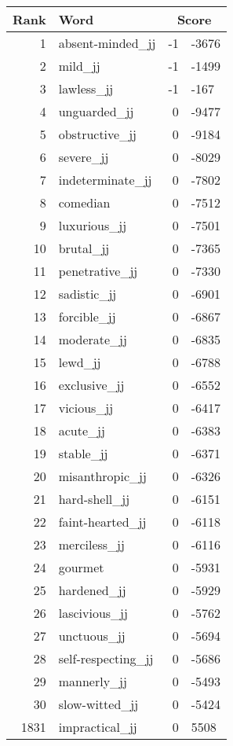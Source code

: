 \begin{longtable}[!htbp]{| rlr@{.}l |}
    \hline
    \textbf{Rank} & \textbf{Word} & \multicolumn{2}{c|}{\textbf{Score}} \\
    \hline
    \endhead
    1 & absent-minded\_jj & -1 & -3676 \\
    2 & mild\_jj & -1 & -1499 \\
    3 & lawless\_jj & -1 & -167 \\
    4 & unguarded\_jj & 0 & -9477 \\
    5 & obstructive\_jj & 0 & -9184 \\
    6 & severe\_jj & 0 & -8029 \\
    7 & indeterminate\_jj & 0 & -7802 \\
    8 & comedian & 0 & -7512 \\
    9 & luxurious\_jj & 0 & -7501 \\
    10 & brutal\_jj & 0 & -7365 \\
    11 & penetrative\_jj & 0 & -7330 \\
    12 & sadistic\_jj & 0 & -6901 \\
    13 & forcible\_jj & 0 & -6867 \\
    14 & moderate\_jj & 0 & -6835 \\
    15 & lewd\_jj & 0 & -6788 \\
    16 & exclusive\_jj & 0 & -6552 \\
    17 & vicious\_jj & 0 & -6417 \\
    18 & acute\_jj & 0 & -6383 \\
    19 & stable\_jj & 0 & -6371 \\
    20 & misanthropic\_jj & 0 & -6326 \\
    21 & hard-shell\_jj & 0 & -6151 \\
    22 & faint-hearted\_jj & 0 & -6118 \\
    23 & merciless\_jj & 0 & -6116 \\
    24 & gourmet & 0 & -5931 \\
    25 & hardened\_jj & 0 & -5929 \\
    26 & lascivious\_jj & 0 & -5762 \\
    27 & unctuous\_jj & 0 & -5694 \\
    28 & self-respecting\_jj & 0 & -5686 \\
    29 & mannerly\_jj & 0 & -5493 \\
    30 & slow-witted\_jj & 0 & -5424 \\
    1831 & impractical\_jj & 0 & 5508 \\

\end{longtable}
